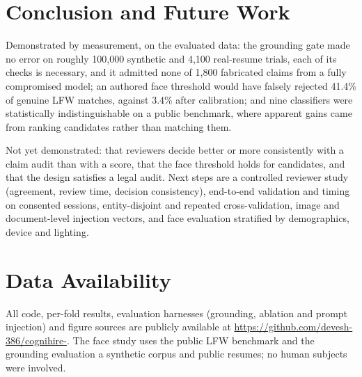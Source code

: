 \documentclass[conference,a4paper]{IEEEtran}
\begin{document}
\section{Conclusion and Future Work}
Demonstrated by measurement, on the evaluated data: the grounding gate made
no error on roughly 100,000 synthetic and 4,100 real-resume trials, each of its
checks is necessary, and it admitted none of 1,800 fabricated claims from a
fully compromised model; an authored face threshold would have falsely
rejected 41.4\% of genuine LFW matches, against 3.4\% after calibration; and
nine classifiers were statistically indistinguishable on a public benchmark,
where apparent gains came from ranking candidates rather than matching them.

Not yet demonstrated: that reviewers decide better or more consistently with a
claim audit than with a score, that the face threshold holds for candidates,
and that the design satisfies a legal audit. Next steps are a controlled
reviewer study (agreement, review time, decision consistency), end-to-end
validation and timing on consented sessions, entity-disjoint and repeated
cross-validation, image and document-level injection vectors, and face
evaluation stratified by demographics, device and lighting.

\section*{Data Availability}
All code, per-fold results, evaluation harnesses (grounding, ablation and
prompt injection) and figure sources are publicly available at
\url{https://github.com/devesh-386/cognihire-}. The face study uses the
public LFW benchmark and the grounding evaluation a synthetic corpus and public
resumes; no human subjects were involved.
\end{document}
